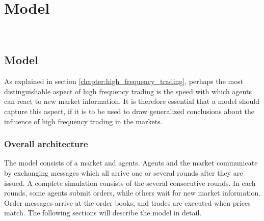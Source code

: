 
\chapter{Model} %

\label{chapter:model} %
$\frac{}{}$
	

\section{Model}
As explained in section \ref{chapter:high_frequency_trading}, perhaps the most distinguishable aspect of high frequency trading is the speed with which agents can react to new market information. It is therefore essential that a model should capture this aspect, if it is to be used to draw generalized conclusions about the influence of high frequency trading in the markets.

\subsection{Overall architecture}
The model consists of a market and agents. Agents and the market communicate by exchanging messages which all arrive one or several rounds after they are issued. A complete simulation consists of the several consecutive rounds. In each rounds, some agents submit orders, while others wait for new market information. Order messages arrive at the order books, and trades are executed when prices match.  The following sections will describe the model in detail.



